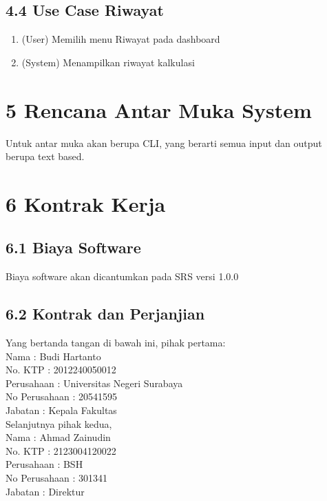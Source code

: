 \documentclass[a4paper]{article}
\begin{document}
    \subsection*{4.4 Use Case Riwayat}
    \begin{enumerate}
        \item (User) Memilih menu Riwayat pada dashboard
        \item (System) Menampilkan riwayat kalkulasi
    \end{enumerate}
\section*{5 Rencana Antar Muka System}
\noindent Untuk antar muka akan berupa CLI, yang berarti semua input dan
output berupa text based.
\section*{6 Kontrak Kerja}
    \subsection*{6.1 Biaya Software}
    Biaya software akan dicantumkan pada SRS versi 1.0.0

    \subsection*{6.2 Kontrak dan Perjanjian}
    \noindent Yang bertanda tangan di bawah ini, pihak pertama:\\
    \noindent
    Nama 			: Budi Hartanto \\
    No. KTP 		: 2012240050012 \\
    Perusahaan 		: Universitas Negeri Surabaya \\
    No Perusahaan   : 20541595 \\
    Jabatan 		: Kepala Fakultas \\

    \noindent Selanjutnya pihak kedua,\\
    Nama 			: Ahmad Zainudin\\
    No. KTP 		: 2123004120022 \\
    Perusahaan 		: BSH  \\
    No Perusahaan 	: 301341 \\
    Jabatan 		: Direktur \\
\end{document}
